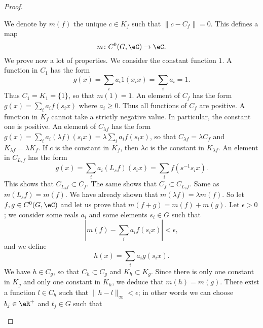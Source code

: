 \begin{proof}
\begin{subproof}
    \spitem[Definition of \( m\)]
        We denote by \( m(f)\) the unique \( c\in K_f\) such that \( \| c-C_f \|=0\). This defines a map
        \begin{equation}
            m\colon C^0(G,\eC)\to \eC.
        \end{equation}
        We prove now a lot of properties.
    \spitem[\( m(1)=1\)]
        We consider the constant function \( 1\). A function in \( C_1\) has the form
        \begin{equation}
            g(x)=\sum_ia_i1(x_ix)=\sum_ia_i=1.
        \end{equation}
        Thus \( C_1=K_1=\{ 1 \}\), so that \( m(1)=1\).
            An element of \( C_f\) has the form \( g(x)=\sum_ia_if(s_ix)\) where \( a_i\geq 0\). Thus all functions of \( C_f\) are positive. A function in \( K_f\) cannot take a strictly negative value. In particular, the constant one is positive.
        \spitem[\( m(\lambda f)=\lambda m(f)\)]
            An element of \( C_{\lambda f}\) has the form \( g(x)=\sum_ia_i(\lambda f)(s_ix)=\lambda\sum_ia_if(s_ix)\), so that \( C_{\lambda f}=\lambda C_f\) and \( K_{\lambda f}=\lambda K_f\). If \( c\) is the constant in \( K_f\), then \( \lambda c\) is the constant in \( K_{\lambda f}\).
        \spitem[\( m(L_sf)=m(f)\)]
            An element in \( C_{L_sf}\) has the form
            \begin{equation}
                g(x)=\sum_ia_i(L_sf)(s_ix)=\sum_if(s^{-1}s_ix).
            \end{equation}
            This shows that \( C_{L_sf}\subset C_f\). The same shows that \( C_f\subset C_{L_sf}\).
        \spitem[\( m(R_sf)=m(f)\)]
            Same as \( m(L_sf)=m(f)\).
        \spitem[\( m\) is linear]
            We have already shown that \( m(\lambda f)=\lambda m(f)\). So let \( f,g\in C^0(G,\eC)\) and let us prove that \( m(f+g)=m(f)+m(g)\). Let \( \epsilon>0\); we consider some reals \( a_i\) and some elements \( s_i\in G\) such that
            \begin{equation}        \label{EQooDDZXooWIPAhX}
                | m(f)-\sum_ia_if(s_ix) |<\epsilon,
            \end{equation}
            and we define
            \begin{equation}
                h(x)=\sum_ia_ig(s_ix).
            \end{equation}
            We have \( h\in C_g\), so that \( C_h\subset C_g\) and \( K_h\subset K_g\). Since there is only one constant in \( K_g\) and only one constant in \( K_h\), we deduce that \( m(h)=m(g)\). There exist a function \( l\in C_h\) such that \( \| h-l \|_{\infty}<\epsilon\); in other words we can choose \( b_j\in \eR^+\) and \( t_j\in G\) such that

\end{subproof}
\end{proof}

